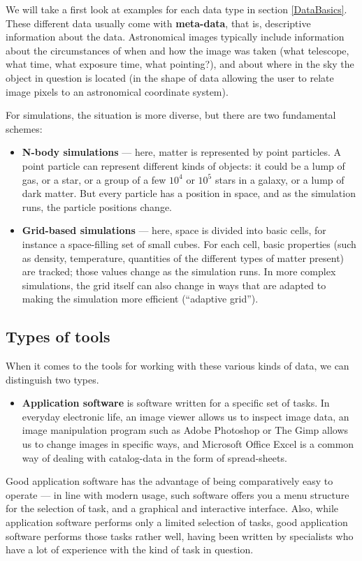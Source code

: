 \documentclass[twocolumn,apj]{openjournal}
\begin{document}
We will take a first look at examples for each data type in section \ref{DataBasics}. These different data usually come with {\bf meta-data}, that is, descriptive information about the data. Astronomical images typically include information about the circumstances of when and how the image was taken (what telescope, what time, what exposure time, what pointing?), and about where in the sky the object in question is located (in the shape of data allowing the user to relate image pixels to an astronomical coordinate system).

For simulations, the situation is more diverse, but there are two fundamental schemes:
\begin{itemize}
\item {\bf N-body simulations} --- here, matter is represented by point particles. A point particle can represent different kinds of objects: it could be a lump of gas, or a star, or a group of a few $10^4$ or $10^5$ stars in a galaxy, or a lump of dark matter. But every particle has a position in space, and as the simulation runs, the particle positions change.
\item {\bf Grid-based simulations} --- here, space is divided into basic cells, for instance a space-filling set of small cubes. For each cell, basic properties (such as density, temperature, quantities of the different types of matter present) are tracked; those values change as the simulation runs. In more complex simulations, the grid itself can also change in ways that are adapted to making the simulation more efficient (``adaptive grid'').
\end{itemize}


\subsection{Types of tools}

When it comes to the tools for working with these various kinds of data, we can distinguish two types. 
\begin{itemize}
\item {\bf Application software} is software written for a specific set of tasks. In everyday electronic life, an image viewer allows us to inspect image data, an image manipulation program such as Adobe Photoshop or The Gimp allows us to change images in specific ways, and Microsoft Office Excel is a common way of dealing with catalog-data in the form of spread-sheets. 
\end{itemize}
Good application software has the advantage of being comparatively easy to operate --- in line with modern usage, such software offers you a menu structure for the selection of task, and a graphical and interactive interface. Also, while application software performs only a limited selection of tasks, good application software performs those tasks rather well, having been written by specialists who have a lot of experience with the kind of task in question.
\end{document}
